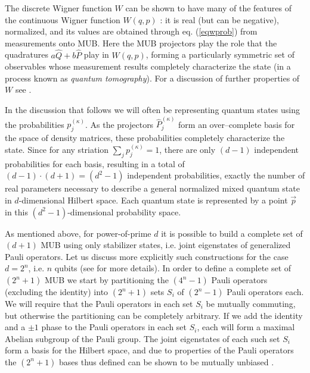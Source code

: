 \documentclass[aps,twocolumn,showpacs,nofootinbib,superscriptaddress]{revtex4}
\begin{document}
The discrete Wigner function $W$ can be shown to have many of the
features of the continuous Wigner function $W(q,p)$
\cite{GibbonsHW04}: it is real (but can be negative), normalized,
and its values are obtained through eq. (\ref{eqwprob}) from
measurements onto MUB. Here the MUB projectors play the role that
the quadratures $a\hat{Q}+b\hat{P}$ play in $W(q,p)$, forming a
particularly symmetric set of observables whose measurement
results completely characterize the state (in a process known as
\textit{quantum tomography}). For a discussion of further
properties of $W$ see \cite{GibbonsHW04, PazRS04b, PittengerR04}.

In the discussion that follows we will often be representing
quantum states using the probabilities $p^{(\kappa)}_j$. As the
projectors $\hat{P}^{(\kappa)}_j$ form an over--complete basis for
the space of density matrices, these probabilities completely
characterize the state. Since for any striation $\sum_j
p^{(\kappa)}_j=1$, there are only $(d-1)$ independent
probabilities for each basis, resulting in a total of
$(d-1)\cdot(d+1)=(d^2-1)$ independent probabilities, exactly the
number of real parameters necessary to describe a general
normalized mixed quantum state in $d$-dimensional Hilbert space.
Each quantum state is represented by a point $\vec{p}$ in this
$(d^2-1)$-dimensional probability space.

As mentioned above, for power-of-prime $d$ it is possible to build
a complete set of $(d+1)$ MUB using only stabilizer states, i.e.
joint eigenstates of generalized Pauli operators. Let us discuss
more explicitly such constructions for the case $d=2^n$, i.e. $n$
qubits (see \cite{LawrenceBZ02} for more details). In order to
define a complete set of $(2^n+1)$ MUB we start by partitioning
the $(4^n -1)$ Pauli operators (excluding the identity) into
$(2^n+1)$ sets $S_i$ of $(2^n-1)$ Pauli operators each. We will
require that the Pauli operators in each set $S_i$ be mutually
commuting, but otherwise the partitioning can be completely
arbitrary. If we add the identity and a $\pm1$ phase to the Pauli
operators in each set $S_i$, each will form a maximal Abelian
subgroup of the Pauli group. The joint eigenstates of each such
set $S_i$ form a basis for the Hilbert space, and due to
properties of the Pauli operators the $(2^n+1)$ bases thus defined
can be shown to be mutually unbiased \cite{LawrenceBZ02}.
\end{document}
